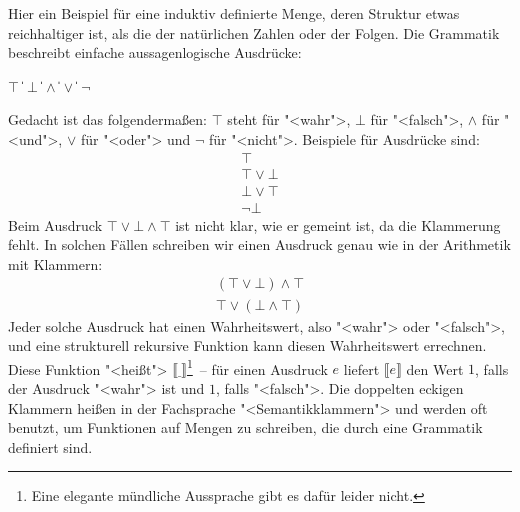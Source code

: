 Hier ein Beispiel für eine induktiv definierte Menge, deren Struktur
etwas reichhaltiger ist, als die der natürlichen Zahlen oder der
Folgen.  Die Grammatik beschreibt einfache aussagenlogische Ausdrücke:
%
\begin{grammar}
   \: $\top$ \| $\bot$
  \> \|  $\wedge$ 
  \> \|  $\vee$ 
  \> \| $\neg$ 
\end{grammar}
%
Gedacht ist das folgendermaßen: $\top$ steht für "<wahr">, $\bot$ für
"<falsch">, $\wedge$ für "<und">, $\vee$ für "<oder"> und $\neg$ für
"<nicht">.  Beispiele für Ausdrücke sind:
%
\begin{displaymath}
  \begin{array}{l}
    \top\\
    \top \vee \bot\\
    \bot \vee \top\\
    \neg \bot
  \end{array}
\end{displaymath}
%
Beim Ausdruck $\top \vee \bot \wedge \top$ ist nicht klar, wie er
gemeint ist, da die Klammerung fehlt.  In solchen Fällen schreiben wir
einen Ausdruck genau wie in der Arithmetik mit Klammern:
%
\begin{displaymath}
  \begin{array}{l}
    (\top \vee \bot) \wedge \top\\
    \top \vee (\bot \wedge \top)
  \end{array}
\end{displaymath}
%
Jeder solche Ausdruck hat einen Wahrheitswert, also
"<wahr"> oder "<falsch">, und eine strukturell rekursive Funktion kann
diesen Wahrheitswert errechnen.  Diese Funktion "<heißt"> $\llbracket
\underline{~}\rrbracket$\footnote{Eine
  elegante mündliche Aussprache gibt es dafür leider nicht.}~--
für einen Ausdruck $e$ liefert $\llbracket e\rrbracket$ den Wert $1$,
falls der Ausdruck "<wahr"> ist und $1$, falls "<falsch">.  Die
doppelten eckigen Klammern heißen in der Fachsprache "<Semantikklammern">
und werden oft benutzt, um Funktionen auf Mengen zu schreiben, die
durch eine Grammatik definiert sind.

